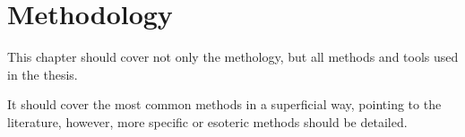 \chapter{Methodology}

This chapter should cover not only the methology, but all methods and tools used in the thesis.

It should cover the most common methods in a superficial way, pointing to the literature, however, more specific or esoteric methods should be detailed.


